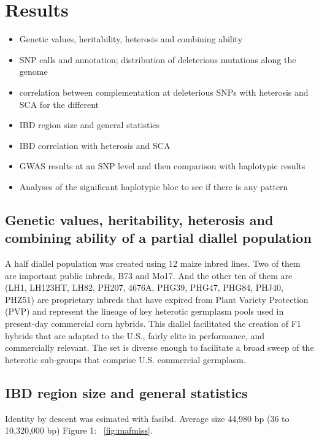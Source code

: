 \documentclass[10pt]{article}
\begin{document}
\section*{Results}

\begin{itemize}
  \item Genetic values, heritability, heterosis and combining ability 
  \item SNP calls and annotation; distribution of deleterious mutations along the genome 
  \item correlation between complementation at deleterious SNPs with heterosis and SCA for the different 
  \item IBD region size and general statistics 
  \item IBD correlation with heterosis and SCA
  \item GWAS results at an SNP level and then comparison with haplotypic results 
  \item Analyses of the significant haplotypic bloc to see if there is any pattern
\end{itemize}

\subsection*{Genetic values, heritability, heterosis and combining ability of a partial diallel population}

A half diallel population was created using 12 maize inbred lines. Two of them are important public inbreds, B73 and Mo17. And the other ten of them are (LH1, LH123HT, LH82, PH207, 4676A, PHG39, PHG47, PHG84, PHJ40, PHZ51) are proprietary inbreds that have expired from Plant Variety Protection (PVP) and represent the lineage of key heterotic germplasm pools used in present-day commercial corn hybrids. This diallel facilitated the creation of F1 hybrids that are adapted to the U.S., fairly elite in performance, and commercially relevant. The set is diverse enough to facilitate a broad sweep of the heterotic sub-groups that comprise U.S. commercial germplasm.


\subsection*{IBD region size and general statistics}

Identity by descent was esimated with fasibd.
Average size 44,980 bp (36 to 10,320,000 bp)
Figure 1: ~\ref{fig:mafmiss}.
\end{document}
